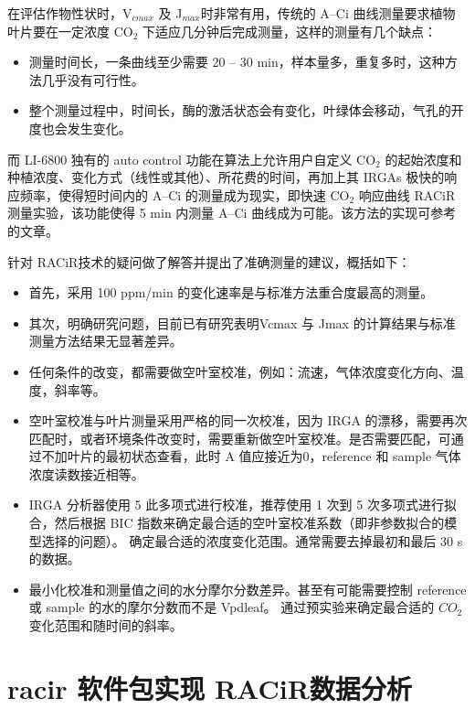 \documentclass[
]{krantz}
\providecommand{\tightlist}{%
  \setlength{\itemsep}{0pt}\setlength{\parskip}{0pt}}
\begin{document}
在评估作物性状时，V\(_{cmax}\) 及 J\(_{max}\)时非常有用，传统的 A--Ci 曲线测量要求植物叶片要在一定浓度 CO\(_{2}\)
下适应几分钟后完成测量，这样的测量有几个缺点：

\begin{itemize}
\tightlist
\item
  测量时间长，一条曲线至少需要 20 -- 30 min，样本量多，重复多时，这种方法几乎没有可行性。
\item
  整个测量过程中，时间长，酶的激活状态会有变化，叶绿体会移动，气孔的开度也会发生变化。
\end{itemize}

而 LI-6800 独有的 auto control 功能在算法上允许用户自定义 CO\(_{2}\) 的起始浓度和种植浓度、变化方式（线性或其他）、所花费的时间，再加上其
IRGAs 极快的响应频率，使得短时间内的 A--Ci 的测量成为现实，即快速 CO\(_{2}\) 响应曲线 RACiR\texttrademark
测量实验，该功能使得 5 min 内测量 A--Ci 曲线成为可能。该方法的实现可参考 \citet{stinziano2017}
的文章。

\citet{stinziano2018} 针对 RACiR\texttrademark 技术的疑问做了解答并提出了准确测量的建议，概括如下：

\begin{itemize}
\tightlist
\item
  首先，采用 100 ppm/min 的变化速率是与标准方法重合度最高的测量。
\item
  其次，明确研究问题，目前已有研究表明Vcmax 与 Jmax 的计算结果与标准测量方法结果无显著差异。
\item
  任何条件的改变，都需要做空叶室校准，例如：流速，气体浓度变化方向、温度，斜率等。
\item
  空叶室校准与叶片测量采用严格的同一次校准，因为 IRGA 的漂移，需要再次匹配时，或者环境条件改变时，需要重新做空叶室校准。是否需要匹配，可通过不加叶片的最初状态查看，此时 A 值应接近为0，reference 和 sample 气体浓度读数接近相等。
\item
  IRGA 分析器使用 5 此多项式进行校准，推荐使用 1 次到 5 次多项式进行拟合，然后根据 BIC 指数来确定最合适的空叶室校准系数（即非参数拟合的模型选择的问题）。
  确定最合适的浓度变化范围。通常需要去掉最初和最后 30 s的数据。
\item
  最小化校准和测量值之间的水分摩尔分数差异。甚至有可能需要控制 reference 或 sample 的水的摩尔分数而不是 Vpdleaf。
  通过预实验来确定最合适的 \(CO_2\) 变化范围和随时间的斜率。
\end{itemize}

\hypertarget{racir_pkg}{%
\section{\texorpdfstring{racir 软件包实现 RACiR\texttrademark 数据分析}{racir 软件包实现 RACiR数据分析}}\label{racir_pkg}}
\end{document}
